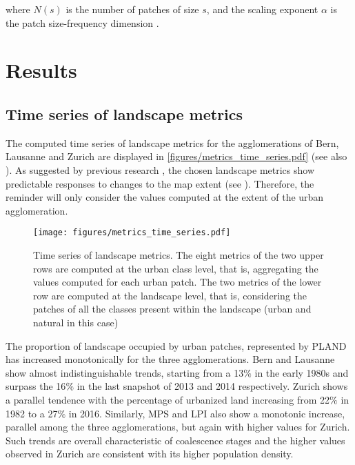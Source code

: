 where $N(s)$ is the number of patches of size $s$, and the scaling exponent $\alpha$ is the patch size-frequency dimension \citep{white1993cellular}.


\section*{Results}

\subsection*{Time series of landscape metrics}

The computed time series of landscape metrics for the agglomerations of Bern, Lausanne and Zurich are displayed in \autoref{figures/metrics_time_series.pdf} (see also ).
As suggested by previous research \citep{wu2002empirical, wu2004effects}, the chosen landscape metrics show predictable responses to changes to the map extent (see ). Therefore, the reminder will only consider the values computed at the extent of the urban agglomeration.

\begin{figure}[!ht]
  \begin{adjustwidth}{0cm}{-.4\textwidth}
    \centering  
    \texttt{[image: figures/metrics\_time\_series.pdf]}
    \vspace{.5em}
    \caption[Time series of landscape metrics]{\label{figures/metrics_time_series.pdf}Time series of landscape metrics. The eight metrics of the two upper rows are computed at the urban class level, that is, aggregating the values computed for each urban patch. The two metrics of the lower row are computed at the landscape level, that is, considering the patches of all the classes present within the landscape (urban and natural in this case)}
  \end{adjustwidth}
\end{figure}

The proportion of landscape occupied by urban patches, represented by PLAND has increased monotonically for the three agglomerations. Bern and Lausanne show almost indistinguishable trends, starting from a 13$\%$ in the early 1980s and surpass the 16$\%$ in the last snapshot of 2013 and 2014 respectively. Zurich shows a parallel tendence with the percentage of urbanized land increasing from 22$\%$ in 1982 to a 27$\%$ in 2016.
Similarly, MPS and LPI also show a monotonic increase, parallel among the three agglomerations, but again with higher values for Zurich.
Such trends are overall characteristic of coalescence stages and the higher values observed in Zurich are consistent with its higher population density.

